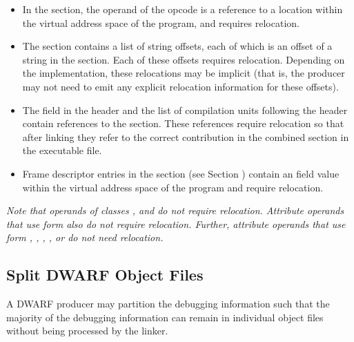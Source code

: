 \begin{itemize}
\item In the \dotdebugline{} section, the operand of the \DWLNEsetaddress{}
opcode is a reference to a location within the virtual address space
of the program, and requires relocation.

\item The \dotdebugstroffsets{} section contains a list of string offsets,
each of which is an offset of a string in the \dotdebugstr{} section. Each
of these offsets requires relocation. Depending on the implementation,
these relocations may be implicit (that is, the producer may not need to
emit any explicit relocation information for these offsets).

\item The \HFNdebuginfooffset{} field in the \dotdebugaranges header and 
the list of compilation units following the \dotdebugnames{} header contain 
references to the \dotdebuginfo{} section.  These references require relocation 
so that after linking they refer to the correct contribution in the combined 
\dotdebuginfo{} section in the executable file.

\item Frame descriptor entries in the \dotdebugframe{} section 
(see Section ) contain an 
\HFNinitiallocation{} field value within the virtual address 
space of the program and require relocation. 

\end{itemize}

\textit{Note that operands of classes \CLASSblock, \CLASSconstant{} and 
\CLASSflag{} do not require relocation. Attribute operands that use 
form \DWFORMstring{} also do not require relocation. Further, 
attribute operands that use form
\DWFORMrefone, \DWFORMreftwo, \DWFORMreffour, \DWFORMrefeight, or
\DWFORMrefudata{} do not need relocation.}

\subsection{Split DWARF Object Files}
\label{datarep:splitdwarfobjectfiles}
A DWARF producer may partition the debugging
information such that the majority of the debugging
information can remain in individual object files without
being processed by the linker. 

